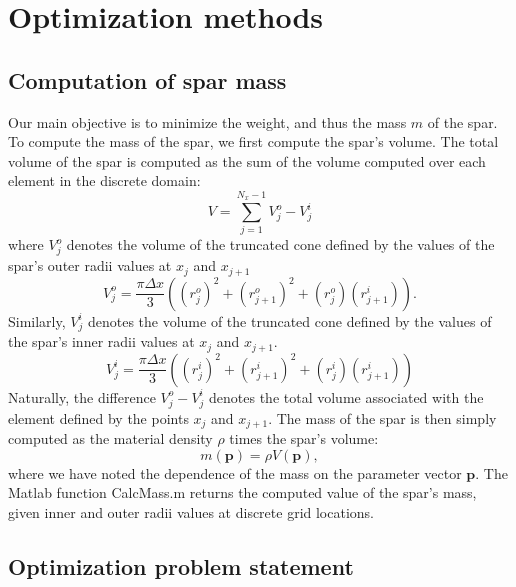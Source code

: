 \documentclass[11pt]{article}
\newcommand{\bs}[1] {\boldsymbol{#1}}
\begin{document}
\section{Optimization methods}

\subsection{Computation of spar mass}

Our main objective is to minimize the weight, and thus
the mass $m$ of the spar. To compute the mass of the
spar, we first compute the spar's volume. The total volume
of the spar is computed as the sum of the volume computed
over each element in the discrete domain:
\begin{equation}
V = \sum^{N_x-1}_{j=1} V^o_j - V^i_j
\end{equation}
where $V^o_j$ denotes the volume of the truncated cone
defined by the values of the spar's outer
radii values at $x_j$ and $x_{j+1}$
\begin{equation}
V^o_j = \frac{\pi \Delta x}{3} ((r^o_j)^2 + (r^o_{j+1})^2 + (r^o_j)(r^i_{j+1})).
\end{equation}
Similarly, $V^i_j$ denotes the volume of the truncated cone
defined by the values of the spar's inner
radii values at $x_j$ and $x_{j+1}$.
\begin{equation}
V^i_j = \frac{\pi \Delta x}{3} ((r^i_j)^2 + (r^i_{j+1})^2 + (r^i_j) (r^i_{j+1}))
\end{equation}
Naturally, the difference $V^o_j-V^i_j$ denotes the
total volume associated with the element defined
by the points $x_j$ and $x_{j+1}$.
The mass of the spar is then simply computed
as the material density $\rho$ times the spar's volume:
\begin{equation}
m(\bs{p}) =  \rho V(\bs{p}),
\end{equation}
where we have noted the dependence of the mass on the parameter
vector $\bs{p}$. The Matlab
function CalcMass.m returns the computed value
of the spar's mass, given inner and outer radii
values at discrete grid locations.

\subsection{Optimization problem statement}
\end{document}
